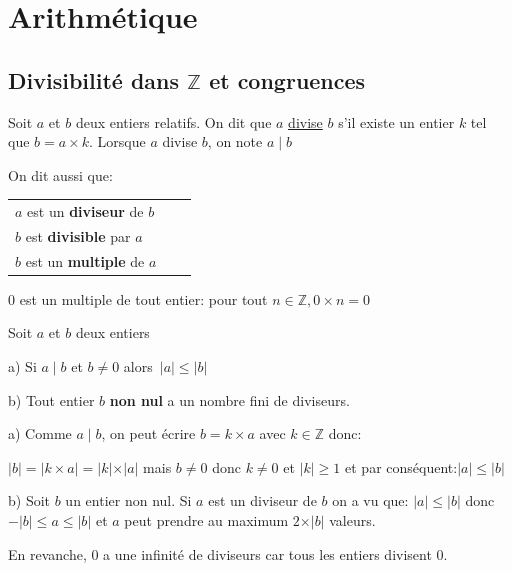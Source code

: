 \documentclass[french]{book}
\begin{document}
\tableofcontents
\chapter{Arithmétique}

\section{Divisibilité dans $\mathbb{Z}$ et congruences}

 \begin{defn}
Soit $a$ et $b$ deux entiers relatifs.
On dit que $a$ \underline{divise} $b$ s'il existe un entier $k$ tel que $b=a\times k$.
Lorsque $a$ divise $b$, on note $a\mid b$ 

On dit aussi que: 
\begin{tabular}[t]{lll}$a$ est un \textbf{diviseur} de $b$\\$b$ est \textbf{divisible} par $a$\\$b$ est un    \textbf{multiple} de $a$
\end{tabular}

\end{defn}

 \begin{rem}

$0$ est un multiple de tout entier: pour tout $n\in \mathbb{Z}, 0 \times n=0$


 \end{rem}

\begin{prop}
Soit $a$ et $b$ deux entiers

a) Si $a \mid b$ et $b \neq 0 $ alors $ \,\vert a \vert \leqslant \vert b \vert$

b) Tout entier $b$ \textbf{non nul }a un nombre fini de diviseurs.

\end{prop}

 \begin{demo}
a) Comme $a \mid b$, on peut écrire $b=k \times a$ avec $k\in \mathbb{Z}$ donc:

$\vert b \vert=\vert k \times a \vert = \vert k\vert \times \vert a\vert$
mais $b\neq 0$ donc $k \neq 0$ et $\vert k\vert \geq1$ et par conséquent:$\vert a\vert\leq\vert b\vert$

b) Soit $b$ un entier non nul. Si $a$ est un diviseur de $b$ on a vu que: $\vert a\vert\leq\vert b\vert$
donc $-\vert b \vert\leq a\leq \vert b \vert$ et $a$ peut prendre au maximum $2 \times \vert b \vert$ valeurs.

En revanche, 0 a une infinité de diviseurs car tous les entiers divisent 0.

\end{demo}
\end{document}
